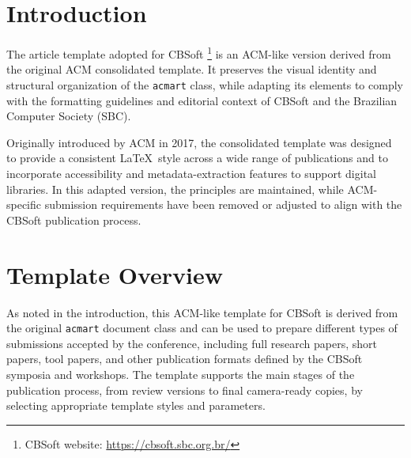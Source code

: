 \documentclass[sigconf]{acmart}
\begin{document}
\begin{abstract}

\end{abstract}


\frenchspacing
\maketitle

\section{Introduction}

The article template adopted for CBSoft \footnote{CBSoft website: \url{
https://cbsoft.sbc.org.br/}} is an ACM-like version derived from the original ACM consolidated template. It preserves the visual identity and structural organization of the \verb|acmart| class, while adapting its elements to comply with the formatting guidelines and editorial context of CBSoft and the Brazilian Computer Society (SBC).

Originally introduced by ACM in 2017, the consolidated template was designed to provide a consistent \LaTeX\ style across a wide range of publications and to incorporate accessibility and metadata-extraction features to support digital libraries. In this adapted version, the principles are maintained, while ACM-specific submission requirements have been removed or adjusted to align with the CBSoft publication process.

\section{Template Overview}

As noted in the introduction, this ACM-like template for CBSoft is derived from the original \verb|acmart| document class and can be used to prepare different types of submissions accepted by the conference, including full research papers, short papers, tool papers, and other publication formats defined by the CBSoft symposia and workshops. The template supports the main stages of the publication process, from review versions to final camera-ready copies, by selecting appropriate template styles and parameters.
\end{document}
